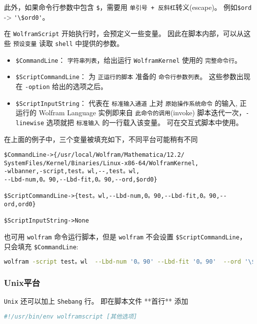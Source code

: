 此外，如果命令行参数中包含 \verb`$`，需要用 \verb`单引号 + 反斜杠`转义(escape)。
例如\verb`$ord` -> \verb`'\$ord0'`。

在 \verb`WolframScript` 开始执行时，会预定义一些变量。
因此在脚本内部，可以从这些 \verb`预设变量` 读取 \verb`shell` 中提供的参数。

\begin{itemize}
\item \verb`$CommandLine`： \verb`字符串列表`，给出运行 \verb`WolframKernel` 使用的 \verb`完整命令行`。
\item \verb`$ScriptCommandLine`： 为 \verb`正运行的脚本` 准备的 \verb`命令行参数列表`。
这些参数出现在 \verb`-option` 给出的选项之后。
\item \verb`$ScriptInputString`： 代表在 \verb`标准输入通道` 上对 \verb`原始操作系统命令` 的输入,
正运行的 Wolfram Language 实例即来自 \verb`此命令的调用`(invoke)
脚本迭代一次，\verb`-linewise` 选项就把 \verb`标准输入` 的一行载入该变量。
可在交互式脚本中使用。
\end{itemize}


在上面的例子中，三个变量被填充如下，不同平台可能稍有不同

\begin{lstlisting}[language=none]
$CommandLine->{/usr/local/Wolfram/Mathematica/12.2/
SystemFiles/Kernel/Binaries/Linux-x86-64/WolframKernel,
-wlbanner,-script,test。wl,--,test。wl,
--Lbd-num,0。90,--Lbd-fit,0。90,--ord,$ord0}

$ScriptCommandLine->{test。wl,--Lbd-num,0。90,--Lbd-fit,0。90,--ord,ord0}

$ScriptInputString->None
\end{lstlisting}

也可用 \verb`wolfram` 命令运行脚本，但是 \verb`wolfram` 不会设置 \verb`$ScriptCommandLine`，只会填充 \verb`$CommandLine`:

\begin{lstlisting}[language=bash]
wolfram -script test。wl  --Lbd-num '0。90' --Lbd-fit '0。90'  --ord '\$ord0'
\end{lstlisting}

\subsubsection{Unix平台} 

\verb`Unix` 还可以加上 \verb`Shebang` 行。 即在脚本文件 **首行** 添加
\begin{lstlisting}[language=bash]
#!/usr/bin/env wolframscript [其他选项]
\end{lstlisting}

